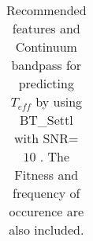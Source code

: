 \begin{table}
\begin{center}
\begin{tabular}{rrrrrrr}
   \hline
\end{tabular}
\caption {Recommended features and Continuum bandpass for predicting $ T_{eff} $ 
      by using BT\_Settl with SNR= $ 10 $ . 
      The Fitness and frequency of occurence are also included.} \label{tab:tab_SNR10_T} 
\end{center}
\end{table}


